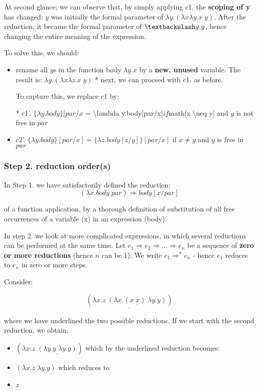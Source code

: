 At second glance, we can observe that, by simply applying c1, the \textbf{scoping of y} has changed: $y$ was initially the formal parameter of $\lambda y.(\lambda x \lambda y.x\;y)$. After the reduction, it became the formal parameter of $\textbackslash y.y$, hence changing the entire meaning of the expression.

To solve this, we should:
\begin{itemize}
	\item  rename all $y$s in the function body $\lambda y.x$ by a \textbf{new, unused} variable. The result is: $ \lambda y.(\lambda x \lambda z.x\;y) $
  * next, we can proceed with c1. as before.

To capture this, we replace c1 by:

  * c1'. $ \{\lambda y.body\}[par/x$ = \textbackslash lambda y.body[par/x]$ if $math[x \textbackslash neq y] and $y$ is not free in $par$
	\item  c2'. $ \{\lambda y.body\}[par/x] = \{\lambda z.body[z/y]\}[par/x]$ if $x \neq y$ and $y$ is free in $par$
\end{itemize}

\subsubsection*{ Step 2. reduction order(s) }

In Step 1. we have satisfactorily defined the reduction:
$$ (\lambda x.body\;par) \Rightarrow body[x/par] $$

of a function application, by a thorough definition of substitution of all free occurrences of a variable (x) in an expression (body).

In step 2. we look at more complicated expressions, in which several reductions can be performed at the same time.
Let $e_1 \Rightarrow e_2 \Rightarrow \ldots \Rightarrow e_n$ be a sequence of \textbf{zero or more reductions} (hence $n$ can be 1). We write $e_1 \Rightarrow^* e_n$ - hence $e_1$ reduces to $e_n$ in zero or more steps.

Consider:

$$ \underline{(\lambda x.z\;\underline{(\lambda x.(x\;x)\;\lambda y.y)})}$$

where we have underlined the two possible reductions. If we start with the second reduction, we obtain:
\begin{itemize}
	\item  $(\lambda x.z\;\underline{(\lambda y.y\;\lambda y.y)})$ which by the underlined reduction becomes:
	\item  $(\lambda x.z\;\lambda y.y)$ which reduces to
	\item  $z$
\end{itemize}

